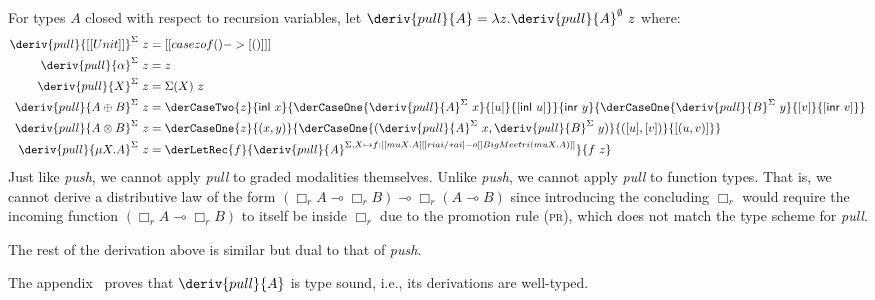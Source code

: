 For types $A$ closed with respect to recursion variables, let $\deriv{pull}{A} = \lambda z
. \deriv{pull}{A}^\emptyset\ z$ where:%
\begin{align*}
  \deriv{pull}{[[ Unit ]]}^\Sigma            \ z & = [[ case z of () -> [ () ] ]]
\\
\deriv{pull}{\alpha}^\Sigma      \ z & = z
                                       \\
\deriv{pull}{X}^\Sigma           \ z & = \Sigma(X)\ z
                                    \\
\deriv{pull}{A \oplus B}^\Sigma  \ z & =\derCaseTwo{z}{\mathsf{inl}\
                                       x}{\derCaseOne{\deriv{pull}{A}^{\Sigma}\ x}{[u]}{[\mathsf{inl}\ u]}}{\mathsf{inr}\ y}
                            {\derCaseOne{\deriv{pull}{B}^{\Sigma}\
                                       y}{[v]}{[\mathsf{inr}\ v]}}
\\
\deriv{pull}{A \otimes B}^\Sigma \ z & =
\derCaseOne{z}{(x, y)}
   {\derCaseOne{(\deriv{pull}{A}^{\Sigma}\ x, \deriv{pull}{B}^{\Sigma}\ y)}
                {([u], [v])}{[(u, v)]}} \\
\deriv{pull}{\mu X . A}^\Sigma \ z & =
   \derLetRec{f}{\deriv{pull}{A}^{\Sigma, X \mapsto f : [[ {mu X . {A [ [] ri ai /* ai ]}}
                                 -o [] {BigMeet ri} (mu X . A) ]] }}{f\ z}
 \end{align*}
%
%
Just like \emph{push}, we cannot apply \emph{pull} to graded modalities themselves. Unlike
\emph{push}, we cannot apply \emph{pull} to function types. That is, we
cannot derive a distributive law of the form $(\Box_r A \multimap \Box_r B)
\multimap \Box_r (A \multimap B)$ since introducing the concluding $\Box_r$
would require the incoming function $(\Box_r A \multimap \Box_r B)$ to
itself be inside $\Box_r$ due to the promotion rule (\textsc{pr}), which does not
match the type scheme for \emph{pull}.

The rest of the derivation above is
similar but dual to that of \emph{push}.

The appendix~\cite{appendix} proves that
$\deriv{pull}{A}$ is type sound, i.e., its derivations are well-typed.

